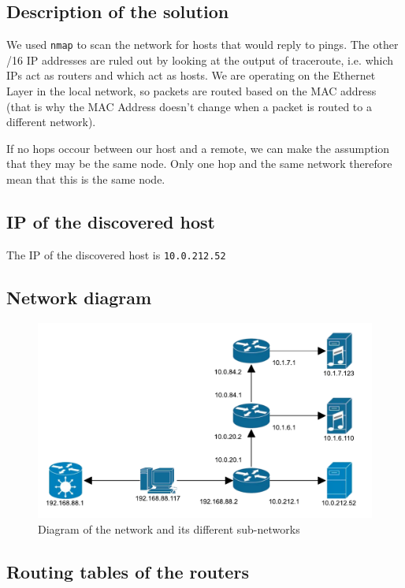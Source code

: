 \documentclass[parskip=full]{scrartcl}
\begin{document}
\subsection{Description of the solution}
We used \texttt{nmap} to scan the network for hosts that would reply to pings. 
The other /16 IP addresses are ruled out by looking at the output of traceroute, i.e. which IPs act as routers and which act as hosts.
We are operating on the Ethernet Layer in the local network, so packets are routed based on the MAC address (that is why the MAC Address doesn't change when a packet is routed to a different network).

If no hops occour between our host and a remote, we can make the assumption that they may be the same node.
Only one hop and the same network therefore mean that this is the same node.

\subsection{IP of the discovered host}
The IP of the discovered host is \texttt{10.0.212.52}
\subsection{Network diagram}
\begin{figure}[ht]
    \centering
    \includegraphics[width=\textwidth]{network_layout.pdf} 
    \caption{Diagram of the network and its different sub-networks}
    \label{fig:networkLayout}
\end{figure}
\subsection{Routing tables of the routers}
\end{document}
